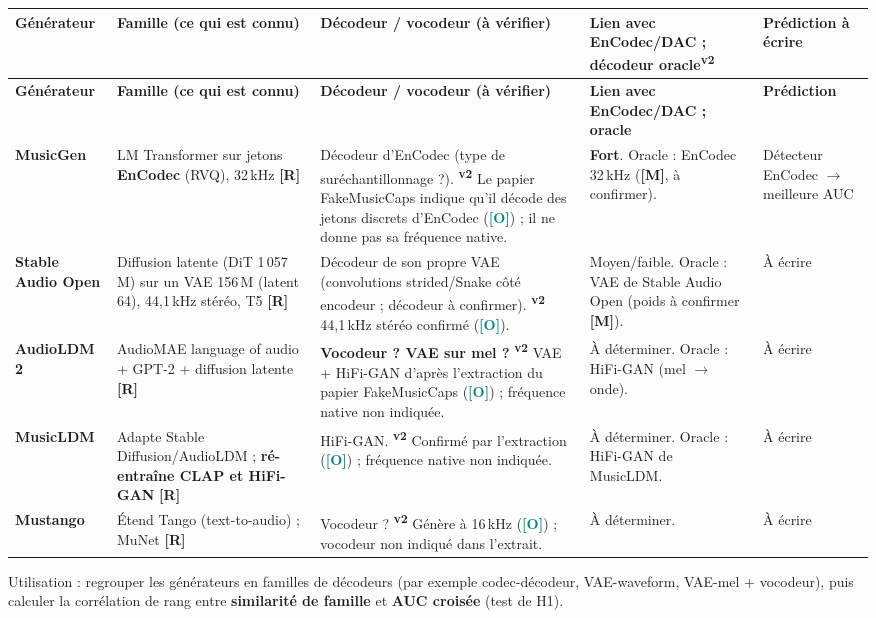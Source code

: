 \documentclass[11pt,a4paper]{article}
\providecommand{\og}{\guillemotleft\nobreakspace}%
\providecommand{\fg}{\nobreakspace\guillemotright}}
\newcommand{\vtwo}{\textsuperscript{\textcolor{orange!80!black}{\textbf{v2}}}}
\newcommand{\lO}{\textbf{\textcolor{teal}{[O]}}}
\newcommand{\lR}{\textbf{\textcolor{orange!80!black}{[R]}}}
\newcommand{\lM}{\textbf{\textcolor{red!70!black}{[M]}}}
\begin{document}
{\footnotesize
\begin{longtable}{L{1.8cm}L{3.7cm}L{4.5cm}L{3.2cm}L{2.1cm}}
\toprule
\textbf{Générateur} & \textbf{Famille (ce qui est connu)} & \textbf{Décodeur / vocodeur (à vérifier)} & \textbf{Lien avec EnCodec/DAC ; décodeur oracle\vtwo} & \textbf{Prédiction à écrire}\\
\midrule
\endfirsthead
\toprule
\textbf{Générateur} & \textbf{Famille (ce qui est connu)} & \textbf{Décodeur / vocodeur (à vérifier)} & \textbf{Lien avec EnCodec/DAC ; oracle} & \textbf{Prédiction}\\
\midrule
\endhead
\bottomrule
\endfoot
\textbf{MusicGen} & LM Transformer sur jetons \textbf{EnCodec} (RVQ), 32\,kHz \lR & Décodeur d'EnCodec (type de suréchantillonnage ?). \vtwo{} Le papier FakeMusicCaps indique qu'il décode des jetons discrets d'EnCodec (\lO) ; il ne donne pas sa fréquence native. & \textbf{Fort}. Oracle : EnCodec 32\,kHz (\lM, à confirmer). & Détecteur \og{}EnCodec\fg{} $\rightarrow$ meilleure AUC\\
\addlinespace
\textbf{Stable Audio Open} & Diffusion latente (DiT 1\,057\,M) sur un VAE 156\,M (latent 64), 44,1\,kHz stéréo, T5 \lR & Décodeur de son propre VAE (convolutions strided/Snake côté encodeur ; décodeur à confirmer). \vtwo{} 44,1\,kHz stéréo confirmé (\lO). & Moyen/faible. Oracle : VAE de Stable Audio Open (poids à confirmer \lM). & À écrire\\
\addlinespace
\textbf{AudioLDM 2} & AudioMAE \og{}language of audio\fg{} + GPT-2 + diffusion latente \lR & \textbf{Vocodeur ? VAE sur mel ?} \vtwo{} VAE + HiFi-GAN d'après l'extraction du papier FakeMusicCaps (\lO) ; fréquence native non indiquée. & À déterminer. Oracle : HiFi-GAN (mel $\rightarrow$ onde). & À écrire\\
\addlinespace
\textbf{MusicLDM} & Adapte Stable Diffusion/AudioLDM ; \textbf{ré-entraîne CLAP et HiFi-GAN} \lR & HiFi-GAN. \vtwo{} Confirmé par l'extraction (\lO) ; fréquence native non indiquée. & À déterminer. Oracle : HiFi-GAN de MusicLDM. & À écrire\\
\addlinespace
\textbf{Mustango} & Étend Tango (text-to-audio) ; MuNet \lR & Vocodeur ? \vtwo{} Génère à 16\,kHz (\lO) ; vocodeur non indiqué dans l'extrait. & À déterminer. & À écrire\\
\end{longtable}}

Utilisation : regrouper les générateurs en familles de décodeurs (par exemple \og{}codec-décodeur\fg{}, \og{}VAE-waveform\fg{}, \og{}VAE-mel + vocodeur\fg{}), puis calculer la corrélation de rang entre \textbf{similarité de famille} et \textbf{AUC croisée} (test de H1).
\end{document}
